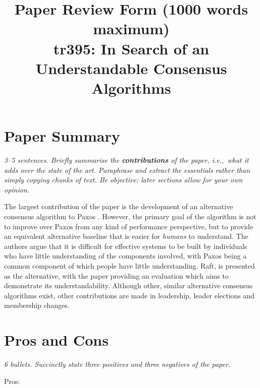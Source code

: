 \documentclass[11pt]{article}
\begin{document}

\title{Paper Review Form (1000 words maximum)\\
    tr395: In Search of an Understandable Consensus Algorithms \cite{Raft}}

\maketitle

\section*{Paper Summary}

\textsl{3--5 sentences. Briefly summarise the {\bf contributions} of the paper,
i.e.,~what it adds over the state of the art. Paraphrase and extract the
essentials rather than simply copying chunks of text. Be objective; later
sections allow for your own opinion.}

The largest contribution of the paper is the development of an alternative
consensus algorithm to Paxos \cite{Paxos}. However, the primary goal of the
algorithm is not to improve over Paxos from any kind of performance
perspective, but to provide an equivalent alternative baseline that is easier
for \textit{humans} to understand. The authors argue that it is difficult for
effective systems to be built by individuals who have little understanding of the
components involved, with Paxos being a common component of which people have
little understanding. Raft, is presented as the alternative, with the paper
providing an evaluation which aims to demonstrate its understandability.
Although other, similar alternative consensus algorithms exist, other
contributions are made in leadership, leader elections and membership changes.

\section*{Pros and Cons}

\textsl{6 bullets. Succinctly state three positives and three negatives of the
paper.}

Pros:
\end{document}
